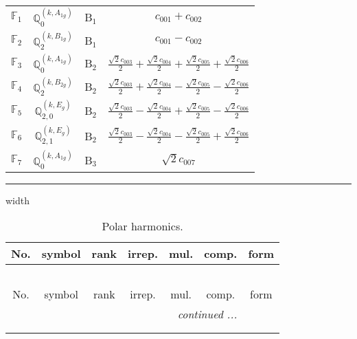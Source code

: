 \documentclass[fleqn,10pt,landscape]{article}
\begin{document}
\begin{itemize}
\begin{center}
\begin{longtable}{c|c|c|c}
$ \mathbb{F}_{1} $ & $\mathbb{Q}_{0}^{(k,A_{1g})}$ & B$_{1}$ & $c_{001} + c_{002}$ \\
$ \mathbb{F}_{2} $ & $\mathbb{Q}_{2}^{(k,B_{1g})}$ & B$_{1}$ & $c_{001} - c_{002}$ \\ \hline
$ \mathbb{F}_{3} $ & $\mathbb{Q}_{0}^{(k,A_{1g})}$ & B$_{2}$ & $\frac{\sqrt{2} c_{003}}{2} + \frac{\sqrt{2} c_{004}}{2} + \frac{\sqrt{2} c_{005}}{2} + \frac{\sqrt{2} c_{006}}{2}$ \\
$ \mathbb{F}_{4} $ & $\mathbb{Q}_{2}^{(k,B_{2g})}$ & B$_{2}$ & $\frac{\sqrt{2} c_{003}}{2} + \frac{\sqrt{2} c_{004}}{2} - \frac{\sqrt{2} c_{005}}{2} - \frac{\sqrt{2} c_{006}}{2}$ \\
$ \mathbb{F}_{5} $ & $\mathbb{Q}_{2,0}^{(k,E_{g})}$ & B$_{2}$ & $\frac{\sqrt{2} c_{003}}{2} - \frac{\sqrt{2} c_{004}}{2} + \frac{\sqrt{2} c_{005}}{2} - \frac{\sqrt{2} c_{006}}{2}$ \\
$ \mathbb{F}_{6} $ & $\mathbb{Q}_{2,1}^{(k,E_{g})}$ & B$_{2}$ & $\frac{\sqrt{2} c_{003}}{2} - \frac{\sqrt{2} c_{004}}{2} - \frac{\sqrt{2} c_{005}}{2} + \frac{\sqrt{2} c_{006}}{2}$ \\ \hline
$ \mathbb{F}_{7} $ & $\mathbb{Q}_{0}^{(k,A_{1g})}$ & B$_{3}$ & $\sqrt{2} c_{007}$ \\
\end{longtable}
\end{center}

 \hfil \hrule height 1mm width \textwidth \hfil

\begin{center}
\renewcommand{\arraystretch}{1.3}
\begin{longtable}{ccccccc}
\caption{Polar harmonics.}
 \\
 \hline \hline
No. & symbol & rank & irrep. & mul. & comp. & form \\ \hline \endfirsthead

\multicolumn{6}{l}{\tablename\ \thetable{}} \\
 \hline \hline
No. & symbol & rank & irrep. & mul. & comp. & form \\ \hline \endhead

 \hline \hline
\multicolumn{6}{r}{\footnotesize\it continued ...} \\ \endfoot

 \hline \hline
\multicolumn{6}{r}{} \\ \endlastfoot


\end{longtable}
\end{center}
\end{itemize}
\end{document}

